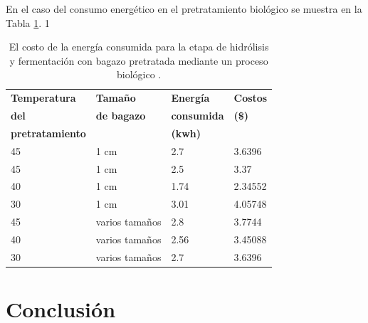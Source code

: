 \documentclass[12pt]{article}
\begin{document}
	En el caso del consumo energético en el pretratamiento biológico se muestra en la Tabla 	\ref{energi_fermentacion en biologico}.
	1
	\begin{table}[H]
		\centering
			\label{energi_fermentacion en biologico}
		\caption{El costo de la energía consumida para la etapa de hidrólisis y fermentación con bagazo pretratada mediante un proceso biológico . }
            {\fontsize{9}{10.8}\selectfont %
		\begin{tabular}{|l|l|l|l|}
				\hline
\textbf{Temperatura} & \textbf{Tamaño } & \textbf{Energía } & \textbf{Costos } \\ 
\textbf{del} &	\textbf{ de bagazo}   & 	\textbf{consumida  }& 	\textbf{(\$)} \\ 
\textbf{pretratamiento}  &    & \textbf{(kwh)} &  \\ \hline
			45 & 1 cm & 2.7 & 3.6396  \\ \hline
			45 & 1 cm & 2.5 & 3.37  \\ \hline
			40 & 1 cm & 1.74 & 2.34552  \\ \hline
			30 & 1 cm & 3.01 & 4.05748  \\ \hline
			45 & varios tamaños & 2.8 & 3.7744  \\ \hline
			40 & varios tamaños & 2.56 & 3.45088  \\ \hline
			30 & varios tamaños & 2.7 & 3.6396  \\ \hline
		\end{tabular}
}
	\end{table}
	
	
			
		\section*{Conclusión}
			
			
		
		\newpage
	
		 
		
	
\end{document}
